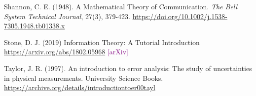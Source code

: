 \documentclass[12pt,a4paper]{article}
\newcommand{\arxiv}{{\small\textcolor{purple}{[arXiv]}}}
\begin{document}
\begin{thebibliography}{9}
 Shannon, C. E. (1948).
    A Mathematical Theory of Communication.
    \textit{The Bell System Technical Journal}, 27(3), 379-423.
    \url{https://doi.org/10.1002/j.1538-7305.1948.tb01338.x}

 Stone, D. J. (2019)
    Information Theory: A Tutorial Introduction
    \url{https://arxiv.org/abs/1802.05968}
    \arxiv

 Taylor, J. R. (1997).
    An introduction to error analysis: The study of uncertainties in physical measurements.
    University Science Books.
    \url{https://archive.org/details/introductiontoer00tayl}
    
\end{thebibliography}
\end{document}
